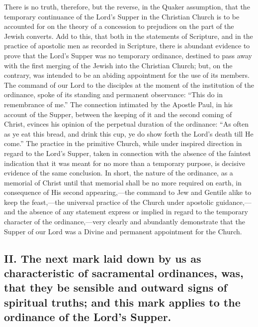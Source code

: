 \documentclass[]{book}
\begin{document}
There is no truth, therefore, but the reverse, in the Quaker assumption, that the temporary continuance of the Lord's Supper in the Christian Church is to be accounted for on the theory of a concession to prejudices on the part of the Jewish converts. Add to this, that both in the statements of Scripture, and in the practice of apostolic men as recorded in Scripture, there is abundant evidence to prove that the Lord's Supper was no temporary ordinance, destined to pass away with the first merging of the Jewish into the Christian Church; but, on the contrary, was intended to be an abiding appointment for the use of its members. The command of our Lord to the disciples at the moment of the institution of the ordinance, spoke of its standing and permanent observance: ``This do in remembrance of me.'' The connection intimated by the Apostle Paul, in his account of the Supper, between the keeping of it and the second coming of Christ, evinces his opinion of the perpetual duration of the ordinance: ``As often as ye eat this bread, and drink this cup, ye do show forth the Lord's death till He come.'' The practice in the primitive Church, while under inspired direction in regard to the Lord's Supper, taken in connection with the absence of the faintest indication that it was meant for no more than a temporary purpose, is decisive evidence of the same conclusion. In short, the nature of the ordinance, as a memorial of Christ until that memorial shall be no more required on earth, in consequence of His second appearing,---the command to Jew and Gentile alike to keep the feast,---the universal practice of the Church under apostolic guidance,---and the absence of any statement express or implied in regard to the temporary character of the ordinance,---very clearly and abundantly demonstrate that the Supper of our Lord was a Divine and permanent appointment for the Church.

\hypertarget{ii.-the-next-mark-laid-down-by-us-as-characteristic-of-sacramental-ordinances-was-that-they-be-sensible-and-outward-signs-of-spiritual-truths-and-this-mark-applies-to-the-ordinance-of-the-lords-supper.}{%
\subsection{II. The next mark laid down by us as characteristic of sacramental ordinances, was, that they be sensible and outward signs of spiritual truths; and this mark applies to the ordinance of the Lord's Supper.}\label{ii.-the-next-mark-laid-down-by-us-as-characteristic-of-sacramental-ordinances-was-that-they-be-sensible-and-outward-signs-of-spiritual-truths-and-this-mark-applies-to-the-ordinance-of-the-lords-supper.}}
\end{document}
